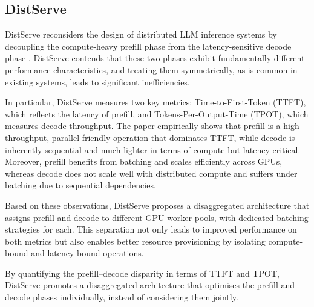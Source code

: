 \documentclass[11pt,twoside]{report}
\begin{document}
\subsection{DistServe}
DistServe reconsiders the design of distributed LLM inference systems by decoupling the compute-heavy prefill phase from the latency-sensitive decode phase \cite{zhang2024distserve}.
DistServe contends that these two phases exhibit fundamentally different performance characteristics, and treating them symmetrically, as is common in existing systems, leads to significant inefficiencies.

In particular, DistServe measures two key metrics: Time-to-First-Token (TTFT), which reflects the latency of prefill, and Tokens-Per-Output-Time (TPOT), which measures decode throughput.
The paper empirically shows that prefill is a high-throughput, parallel-friendly operation that dominates TTFT, while decode is inherently sequential and much lighter in terms of compute but latency-critical.
Moreover, prefill benefits from batching and scales efficiently across GPUs, whereas decode does not scale well with distributed compute and suffers under batching due to sequential dependencies.

Based on these observations, DistServe proposes a disaggregated architecture that assigns prefill and decode to different GPU worker pools, with dedicated batching strategies for each.
This separation not only leads to improved performance on both metrics but also enables better resource provisioning by isolating compute-bound and latency-bound operations.

By quantifying the prefill–decode disparity in terms of TTFT and TPOT, DistServe promotes a disaggregated architecture that optimises the prefill and decode phases individually, instead of considering them jointly.

\end{document}
